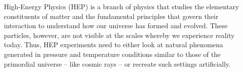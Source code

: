

High-Energy Physics (HEP) is a branch of physics that studies the elementary constituents of matter and the fundamental principles that govern their interaction to understand how our universe has formed and evolved.  
These particles, however, are not visible at the scales whereby we experience reality today. 
Thus, HEP experiments need to either look at natural phenomena generated in pressure and temperature conditions similar to those of the primordial universe -- like cosmic rays -- or recreate such settings artificially.

